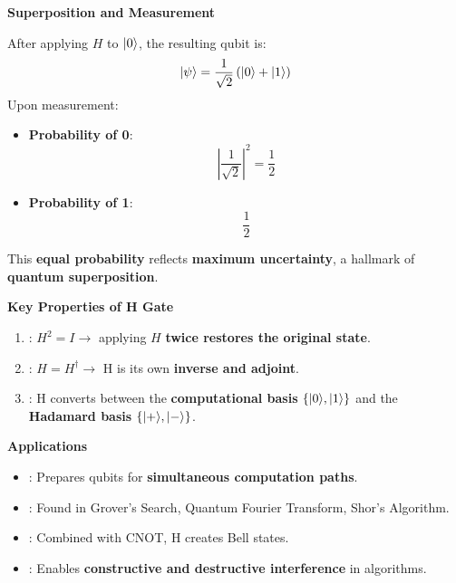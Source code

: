 \highspace
\begin{flushleft}
    \textcolor{Green3}{ \textbf{Superposition and Measurement}}
\end{flushleft}
After applying $H$ to $| 0 \rangle$, the resulting qubit is:
\begin{equation*}
    | \psi \rangle = \dfrac{1}{\sqrt{2}}\left(| 0 \rangle + | 1 \rangle\right)
\end{equation*}
Upon measurement:
\begin{itemize}
    \item \textbf{Probability of 0}:
    \begin{equation*}
        \left|\dfrac{1}{\sqrt{2}}\right|^{2} = \dfrac{1}{2}
    \end{equation*}
    \item \textbf{Probability of 1}:
    \begin{equation*}
        \dfrac{1}{2}
    \end{equation*}
\end{itemize}
This \textbf{equal probability} reflects \textbf{maximum uncertainty}, a hallmark of \textbf{quantum superposition}.

\highspace
\begin{flushleft}
    \textcolor{Green3}{ \textbf{Key Properties of H Gate}}
\end{flushleft}
\begin{enumerate}
    \item {}: $H^{2} = I \rightarrow$ applying $H$ \textbf{twice restores the original state}.
    \item {}: $H = H^{\dagger} \rightarrow$ H is its own \textbf{inverse and adjoint}.
    \item {}: H converts between the \textbf{computational basis} $\left\{| 0 \rangle, | 1 \rangle\right\}$ and the \textbf{Hadamard basis} $\left\{| + \rangle, | - \rangle\right\}$.
\end{enumerate}

\highspace
\begin{flushleft}
    \textcolor{Green3}{ \textbf{Applications}}
\end{flushleft}
\begin{itemize}
    \item {}: Prepares qubits for \textbf{simultaneous computation paths}.
    \item {}: Found in Grover's Search, Quantum Fourier Transform, Shor's Algorithm.
    \item {}: Combined with CNOT, H creates Bell states.
    \item {}: Enables \textbf{constructive and destructive interference} in algorithms.
\end{itemize}
